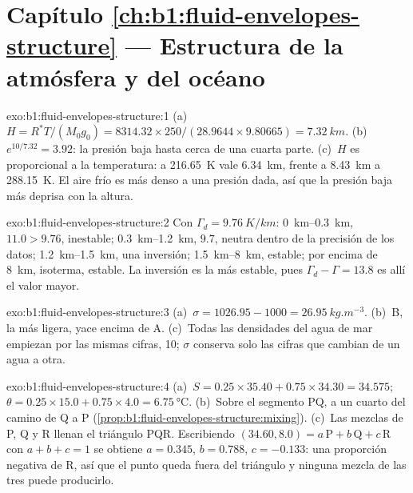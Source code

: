 \section*{Capítulo \ref{ch:b1:fluid-envelopes-structure} --- Estructura de la atmósfera y del océano}

\begin{solution}{exo:b1:fluid-envelopes-structure:1}
(a)~$H = R^*T/(M_0 g_0) = 8314.32 \times 250/(28.9644 \times 9.80665) =
\qty{7.32}{km}$. (b)~$e^{10/7.32} = 3.92$: la presión baja hasta cerca de una cuarta parte.
(c)~$H$ es proporcional a la temperatura: a \qty{216.65}{K} vale
\qty{6.34}{km}, frente a \qty{8.43}{km} a \qty{288.15}{K}. El aire frío es más denso a una presión dada, así que la presión baja más deprisa con la altura.
\end{solution}

\begin{solution}{exo:b1:fluid-envelopes-structure:2}
Con $\Gamma_d = \qty{9.76}{K/km}$: \qtyrange{0}{0.3}{km}, $11.0 > 9.76$,
inestable; \qtyrange{0.3}{1.2}{km}, $9.7$, neutra dentro de la precisión de los datos; \qtyrange{1.2}{1.5}{km}, una inversión; \qtyrange{1.5}{8}{km}, estable;
por encima de \qty{8}{km}, isoterma, estable. La inversión es la más estable, pues $\Gamma_d - \Gamma = 13.8$ es allí el valor mayor.
\end{solution}

\begin{solution}{exo:b1:fluid-envelopes-structure:3}
(a)~$\sigma = 1026.95 - 1000 = \qty{26.95}{kg.m^{-3}}$. (b)~B, la más ligera, yace
encima de A. (c)~Todas las densidades del agua de mar empiezan por las mismas cifras, 10; $\sigma$ conserva solo las cifras que cambian de un agua a otra.
\end{solution}

\begin{solution}{exo:b1:fluid-envelopes-structure:4}
(a)~$S = 0.25 \times 35.40 + 0.75 \times 34.30 = 34.575$; $\theta = 0.25 \times
15.0 + 0.75 \times 4.0 = \qty{6.75}{\celsius}$. (b)~Sobre el segmento PQ, a un cuarto del camino de Q a P (\cref{prop:b1:fluid-envelopes-structure:mixing}).
(c)~Las mezclas de P, Q y R llenan el triángulo PQR. Escribiendo
$(34.60, 8.0) = a\,\mathrm P + b\,\mathrm Q + c\,\mathrm R$ con $a + b + c = 1$
se obtiene $a = 0.345$, $b = 0.788$, $c = -0.133$: una proporción negativa de R, así que el punto queda fuera del triángulo y ninguna mezcla de las tres puede producirlo.
\end{solution}

